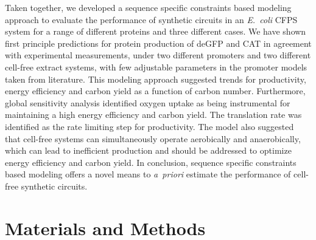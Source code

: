 \documentclass[journal=asbcd6,manuscript=article]{achemso}
\begin{document}
Taken together, we developed a sequence specific constraints based modeling approach to evaluate the performance of synthetic circuits in an \emph{E.~coli} CFPS system for a range of different proteins and three different cases.
We have shown first principle predictions for protein production of deGFP and CAT in agreement with experimental measurements, under two different promoters and two different cell-free extract systems, with few adjustable parameters in the promoter models taken from literature.
This modeling approach suggested trends for productivity, energy efficiency and carbon yield as a function of carbon number.
Furthermore, global sensitivity analysis identified oxygen uptake as being instrumental for maintaining a high energy efficiency and carbon yield.
The translation rate was identified as the rate limiting step for productivity.
The model also suggested that cell-free systems can simultaneously operate aerobically and anaerobically, which can lead to inefficient production and should be addressed to optimize energy efficiency and carbon yield.
In conclusion, sequence specific constraints based modeling offers a novel means to \emph{a~priori} estimate the performance of cell-free synthetic circuits.

\section*{Materials and Methods}
\end{document}
